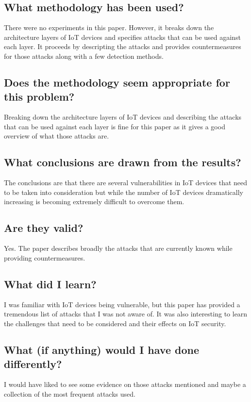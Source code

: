 \documentclass[11pt,a4paper]{article}
\begin{document}
\subsection*{What methodology has been used?}
There were no experiments in this paper. However, it breaks down the architecture layers of IoT devices and specifies attacks that can be used against each layer. It proceeds by descripting the attacks and provides countermeasures for those attacks along with a few detection methods. 

\subsection*{Does the methodology seem appropriate for this problem?}
Breaking down the architecture layers of IoT devices and describing the attacks that can be used against each layer is fine for this paper as it gives a good overview of what those attacks are. 

\subsection*{What conclusions are drawn from the results?}
The conclusions are that there are several vulnerabilities in IoT devices that need to be taken into consideration but while the number of IoT devices dramatically increasing is becoming extremely difficult to overcome them. 

\subsection*{Are they valid?}
Yes. The paper describes broadly the attacks that are currently known while providing countermeasures. 

\subsection*{What did I learn?}
I was familiar with IoT devices being vulnerable, but this paper has provided a tremendous list of attacks that I was not aware of. It was also interesting to learn the challenges that need to be considered and their effects on IoT security. 

\subsection*{What (if anything) would I have done differently?}
I would have liked to see some evidence on those attacks mentioned and maybe a collection of the most frequent attacks used.
\end{document}
